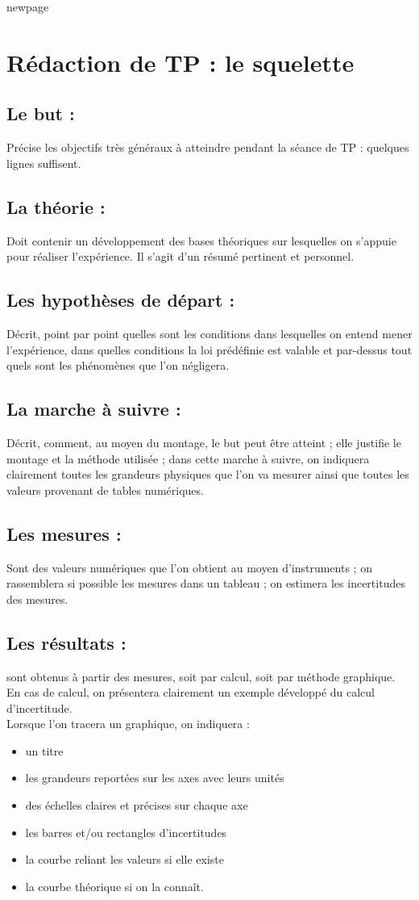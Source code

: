 newpage
\section{Rédaction de TP : le squelette}
\subsection{Le but :}
Précise les objectifs très généraux à atteindre pendant la séance de TP : quelques lignes suffisent.
\subsection{La théorie : }
Doit contenir un développement des bases théoriques sur lesquelles on s'appuie pour réaliser l'expérience. Il s'agit d'un résumé pertinent et personnel.
\subsection{Les hypothèses de départ : }
Décrit, point par point quelles sont les conditions dans lesquelles on entend mener l'expérience, dans quelles conditions la loi prédéfinie est valable et par-dessus tout quels sont les phénomènes que l'on négligera.
\subsection{La marche à suivre : }
Décrit, comment, au moyen du montage, le but peut être atteint ; elle justifie le montage et la méthode utilisée ; dans cette marche à suivre, on indiquera clairement toutes les grandeurs physiques que l'on va mesurer ainsi que toutes les valeurs provenant de tables numériques.
\subsection{Les mesures : }
Sont des valeurs numériques que l'on obtient au moyen d'instruments ; on rassemblera si possible les mesures dans un tableau ; on estimera les incertitudes des mesures.
\subsection{Les résultats : }
sont obtenus à partir des mesures, soit par calcul, soit par méthode graphique.\\
En cas de calcul, on présentera clairement un exemple développé du calcul d'incertitude.\\
Lorsque l'on tracera un graphique, on indiquera :
\begin{itemize}
    \item un titre
    \item les grandeurs reportées sur les axes avec leurs unités
    \item des échelles claires et précises sur chaque axe
    \item les barres et/ou rectangles d'incertitudes
    \item la courbe reliant les valeurs si elle existe
    \item la courbe théorique si on la connaît.
\end{itemize}
